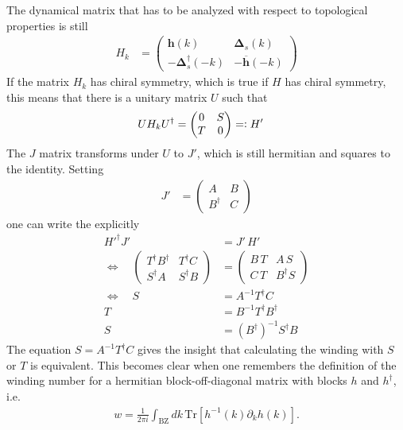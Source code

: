 The dynamical matrix that has to be analyzed with respect to topological properties is still
\begin{align*}
   H_k&=\begin{pmatrix}
        \mathbf{h}(k) & \mathbf{\Delta}_s(k)\\
       - \mathbf{\Delta}_s^\dagger(-k) & -\overline{\mathbf{h}}(-k)
    \end{pmatrix} 
\end{align*}
If the matrix $H_k$ has chiral symmetry, which is true if $H$ has chiral symmetry, this means that there is a unitary matrix $U$ such that
\begin{align*}
    U H_k U^\dagger &= \begin{pmatrix}
        0 & S\\
        T & 0
    \end{pmatrix}=\vcentcolon H'
\end{align*}
The $J$ matrix transforms under $U$ to $J'$, which is still hermitian and squares to the identity. Setting 
\begin{align*}
    J'&= \begin{pmatrix}
        A & B\\
        B^\dagger & C
    \end{pmatrix}
\end{align*}
one can write the explicitly
\begin{align*}
    H'^\dagger J' &= J'\,H'\\
    \Leftrightarrow \quad \begin{pmatrix}
        T^\dagger B^\dagger & T^\dagger C\\
        S^\dagger A & S^\dagger B
    \end{pmatrix}&= \begin{pmatrix}
        B\,T & A\,S\\
        C\,T & B^\dagger S
    \end{pmatrix}\\
    \Leftrightarrow\quad S &= A^{-1}T^\dagger C \\
    T &= B^{-1}T^\dagger B^\dagger\\
    S &= (B^\dagger)^{-1} S^\dagger B
\end{align*}
The equation $S = A^{-1}T^\dagger C$ gives the insight that calculating the winding with $S$ or $T$ is equivalent. This becomes clear when one remembers the definition of the winding number for a hermitian block-off-diagonal matrix with blocks $h$ and $h^\dagger$, i.e. 
\begin{align*}
    w = \frac{1}{2\pi i} \int_\text{BZ} dk \,\text{Tr}\left[h^{-1}(k) \partial_kh(k)\right].
\end{align*}
